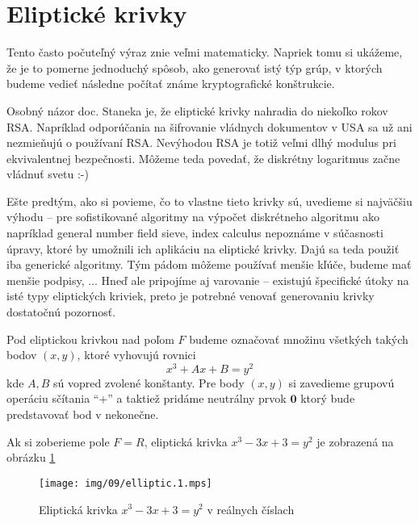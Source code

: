 \section{Eliptické krivky}

Tento často počuteľný výraz znie veľmi matematicky. Napriek tomu si
ukážeme, že je to pomerne jednoduchý spôsob, ako generovať istý týp
grúp, v ktorých budeme vedieť následne počítať známe kryptografické
konštrukcie.

\begin{poznamka}
    Osobný názor doc. Staneka je, že eliptické krivky nahradia do
    niekoľko rokov RSA. Napríklad odporúčania na šifrovanie vládnych
    dokumentov v USA sa už ani nezmieňujú o používaní RSA. Nevýhodou
    RSA je totiž veľmi dlhý modulus pri ekvivalentnej bezpečnosti.
    Môžeme teda povedať, že diskrétny logaritmus začne vládnuť svetu
    :-)
\end{poznamka}

Ešte predtým, ako si povieme, čo to vlastne tieto krivky sú, uvedieme
si najväčšiu výhodu -- pre sofistikované algoritmy na
výpočet diskrétneho algoritmu ako napríklad general number field
sieve, index calculus nepoznáme v súčasnosti úpravy, ktoré by umožnili
ich aplikáciu na eliptické krivky. Dajú sa teda použiť iba generické
algoritmy. Tým pádom môžeme používať menšie kľúče, budeme mať menšie
podpisy, ... Hneď ale pripojíme aj varovanie -- existujú špecifické
útoky na isté typy eliptických kriviek, preto je potrebné venovať
generovaniu krivky dostatočnú pozornosť.

\begin{definicia}
    Pod eliptickou krivkou nad poľom $F$ budeme označovať množinu
    všetkých takých bodov $(x,y)$, ktoré vyhovujú rovnici
    \begin{equation*}
        x^3 + A x + B = y^2
    \end{equation*}
    kde $A,B$ sú vopred zvolené konštanty.
    Pre body $(x,y)$ si zavedieme grupovú operáciu sčítania ``+''
    a taktiež pridáme neutrálny prvok $\mathbf{0}$
    ktorý bude predstavovať bod v nekonečne.
\end{definicia}

Ak si zoberieme pole $F=R$, eliptická krivka $x^3 -3x+3=y^2$ je
zobrazená na obrázku \ref{fig:elliptic1}

\begin{figure}[h]
    \centering
    \texttt{[image: img/09/elliptic.1.mps]}
    \caption{Eliptická krivka $x^3 - 3x +3 = y^2$ v reálnych číslach}
    \label{fig:elliptic1}
\end{figure}

